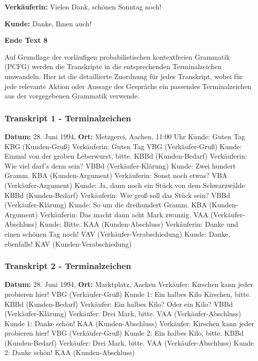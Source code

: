 \documentclass[
]{article}
\begin{document}
\textbf{Verkäuferin:} Vielen Dank, schönen Sonntag noch!

\textbf{Kunde:} Danke, Ihnen auch!

\textbf{Ende Text 8}

Auf Grundlage der vorläufigen probabilistischen kontextfreien Grammatik
(PCFG) werden die Transkripte in die entsprechenden Terminalzeichen
umwandeln. Hier ist die detaillierte Zuordnung für jedes Transkript,
wobei für jede relevante Aktion oder Aussage des Gesprächs ein passendes
Terminalzeichen aus der vorgegebenen Grammatik verwende.

\subsubsection{\texorpdfstring{\textbf{Transkript 1 -
Terminalzeichen}}{Transkript 1 - Terminalzeichen}}\label{transkript-1---terminalzeichen}

\textbf{Datum:} 28. Juni 1994, \textbf{Ort:} Metzgerei, Aachen, 11:00
Uhr\textbar{} Kunde: Guten Tag \textbar{} KBG (Kunden-Gruß) \textbar{}
Verkäuferin: Guten Tag \textbar{} VBG (Verkäufer-Gruß) \textbar{} Kunde:
Einmal von der groben Leberwurst, bitte. \textbar{} KBBd (Kunden-Bedarf)
\textbar{} Verkäuferin: Wie viel darf's denn sein? \textbar{} VBBd
(Verkäufer-Klärung) \textbar{} Kunde: Zwei hundert Gramm. \textbar{} KBA
(Kunden-Argument) \textbar{} Verkäuferin: Sonst noch etwas? \textbar{}
VBA (Verkäufer-Argument) \textbar{} Kunde: Ja, dann noch ein Stück von
dem Schwarzwälde\textbar{} KBBd (Kunden-Bedarf) \textbar{} Verkäuferin:
Wie groß soll das Stück sein? \textbar{} VBBd (Verkäufer-Klärung)
\textbar{} Kunde: So um die dreihundert Gramm. \textbar{} KBA
(Kunden-Argument) \textbar{} Verkäuferin: Das macht dann acht Mark
zwanzig. \textbar{} VAA (Verkäufer-Abschluss) \textbar{} Kunde: Bitte.
\textbar{} KAA (Kunden-Abschluss) \textbar{} Verkäuferin: Danke und
einen schönen Tag noch! \textbar{} VAV (Verkäufer-Verabschiedung)
\textbar{} Kunde: Danke, ebenfalls! \textbar{} KAV
(Kunden-Verabschiedung)\textbar{}

\subsubsection{\texorpdfstring{\textbf{Transkript 2 -
Terminalzeichen}}{Transkript 2 - Terminalzeichen}}\label{transkript-2---terminalzeichen}

\textbf{Datum:} 28. Juni 1994, \textbf{Ort:} Marktplatz,
Aachen\textbar{} Verkäufer: Kirschen kann jeder probieren hier!
\textbar{} VBG (Verkäufer-Gruß) \textbar{} Kunde 1: Ein halbes Kilo
Kirschen, bitte. \textbar{} KBBd (Kunden-Bedarf) \textbar{} Verkäufer:
Ein halbes Kilo? Oder ein Kilo? \textbar{} VBBd (Verkäufer-Klärung)
\textbar{} Verkäufer: Drei Mark, bitte. \textbar{} VAA
(Verkäufer-Abschluss) \textbar{} Kunde 1: Danke schön! \textbar{} KAA
(Kunden-Abschluss) \textbar{} Verkäufer: Kirschen kann jeder probieren
hier! \textbar{} VBG (Verkäufer-Gruß) \textbar{} Kunde 2: Ein halbes
Kilo, bitte. \textbar{} KBBd (Kunden-Bedarf) \textbar{} Verkäufer: Drei
Mark, bitte. \textbar{} VAA (Verkäufer-Abschluss) \textbar{} Kunde 2:
Danke schön! \textbar{} KAA (Kunden-Abschluss)
\end{document}

